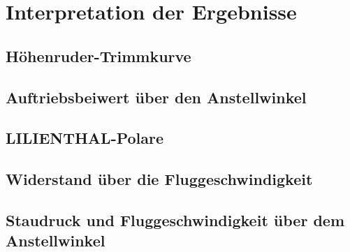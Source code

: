 \chapter{Interpretation der Ergebnisse}
\label{chapter:interpretation}

\section{Höhenruder-Trimmkurve}
\newpage

\section{Auftriebsbeiwert über den Anstellwinkel}
\newpage

\section{LILIENTHAL-Polare}
\newpage

\section{Widerstand über die Fluggeschwindigkeit}
\newpage

\section{Staudruck und Fluggeschwindigkeit über dem Anstellwinkel}
\newpage